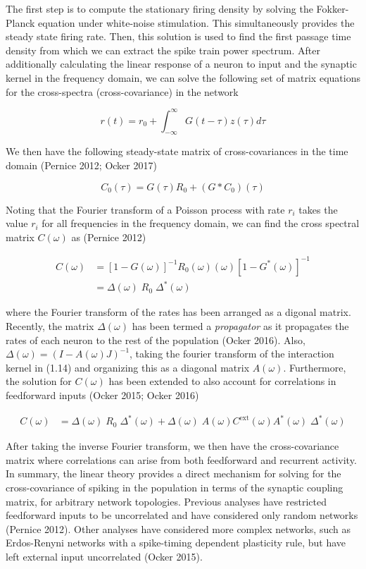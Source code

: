 \documentclass{ucetd}
\begin{document}
The first step is to compute the stationary firing density by solving the Fokker-Planck equation under white-noise stimulation. This simultaneously provides the steady state firing rate. Then, this solution is used to find the first passage time density from which we can extract the spike train power spectrum. After additionally calculating the linear response of a neuron to input and the synaptic kernel in the frequency domain, we can solve the following set of matrix equations for the cross-spectra (cross-covariance) in the network


\begin{equation}
r(t) = r_{0} + \int_{-\infty}^{\infty} G(t-\tau)z(\tau)d\tau
\end{equation}

We then have the following steady-state matrix of cross-covariances in the time domain (Pernice 2012; Ocker 2017)

\begin{equation}
C_{0}(\tau) = G(\tau)R_{0} + (G*C_{0})(\tau)
\end{equation} 

Noting that the Fourier transform of a Poisson process with rate $r_{i}$ takes the value $r_{i}$ for all frequencies in the frequency domain, we can find the cross spectral matrix $C(\omega)$ as (Pernice 2012)

\begin{align}
C(\omega) &= [1-G(\omega)]^{-1}R_{0}(\omega)(\omega)[1-G^{*}(\omega)]^{-1}\\
&= \Delta(\omega)\;R_{0}\;\Delta^{*}(\omega)
\end{align} 

where the Fourier transform of the rates has been arranged as a digonal matrix. Recently, the matrix $\Delta(\omega)$ has been termed a \emph{propagator} as it propagates the rates of each neuron to the rest of the population (Ocker 2016). Also, $\Delta(\omega) = (I - A(\omega)J)^{-1}$, taking the fourier transform of the interaction kernel in (1.14) and organizing this as a diagonal matrix $A(\omega)$. Furthermore, the solution for $C(\omega)$ has been extended to also account for correlations in feedforward inputs (Ocker 2015; Ocker 2016)

\begin{align}
C(\omega) &= \Delta(\omega)\;R_{0}\;\Delta^{*}(\omega) + \Delta(\omega)\;A(\omega)C^{\mathrm{ext}}(\omega)A^{*}(\omega)\;\Delta^{*}(\omega)
\end{align} 
 
After taking the inverse Fourier transform, we then have the cross-covariance matrix where correlations can arise from both feedforward and recurrent activity. In summary, the linear theory provides a direct mechanism for solving for the cross-covariance of spiking in the population in terms of the synaptic coupling matrix, for arbitrary network topologies. Previous analyses have restricted feedforward inputs to be uncorrelated and have considered only random networks (Pernice 2012). Other analyses have considered more complex networks, such as Erdos-Renyni networks with a spike-timing dependent plasticity rule, but have left external input uncorrelated (Ocker 2015).
\end{document}
